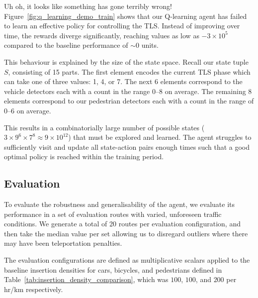 \documentclass[a4paper]{report}
\begin{document}
Uh oh, it looks like something has gone terribly wrong! Figure~\ref{fig:q_learning_demo_train}\footnotemark{} shows that our Q-learning agent has failed to learn an effective policy for controlling the TLS. Instead of improving over time, the rewards diverge significantly, reaching values as low as $-3\times10^5$ compared to the baseline performance of $\sim0$ units.

This behaviour is explained by the size of the state space. Recall our state tuple $S$, consisting of 15 parts. The first element encodes the current TLS phase which can take one of three values: 1, 4, or 7. The next 6 elements correspond to the vehicle detectors each with a count in the range 0--8 on average. The remaining 8 elements correspond to our pedestrian detectors each with a count in the range of 0--6 on average.  

This results in a combinatorially large number of possible states ($3\times9^6\times7^8\approx9\times10^{12}$) that must be explored and learned. The agent struggles to sufficiently visit and update all state-action pairs enough times such that a good optimal policy is reached within the training period.

\subsection{Evaluation}

To evaluate the robustness and generalisability of the agent, we evaluate its performance in a set of evaluation routes with varied, unforeseen traffic conditions. We generate a total of 20 routes per evaluation configuration, and then take the median value per set allowing us to disregard outliers where there may have been teleportation penalties.

The evaluation configurations are defined as multiplicative scalars applied to the baseline insertion densities for cars, bicycles, and pedestrians defined in Table~\ref{tab:insertion_density_comparison}, which was $100$, $100$, and $200$ per hr/km respectively.
\end{document}
